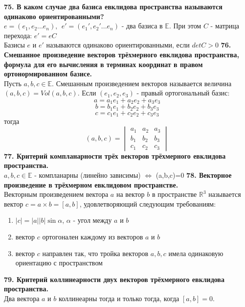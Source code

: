 \documentclass{article}
\begin{document}
\newline
\newline
\textbf{75. В каком случае два базиса евклидова пространства называются одинаково ориентированными?}\\
$e=(e_1,e_2...e_n),~~e'=(e_1',e_2'...e_n)$ - два базиса в $\mathbb{E}$. При этом $C$ - матрица перехода: $e'=eC$\\
Базисы $e$ и $e'$ называются одинаково ориентированными, если $detC>0$
\newline
\newline
\textbf{76. Смешанное произведение векторов трёхмерного евклидова пространства, формула для его вычисления в терминах координат в правом ортонормированном базисе.}\\
Пусть $a,b,c \in \mathbb{E}$. Смешанным произведением векторов называется величина $(a,b,c)=Vol(a,b,c)$. Если $(e_1,e_2,e_3)$ - правый ортогональный базис:
$$a = a_1e_1+a_2e_2+a_3e_3$$
$$b = b_1e_1+b_2e_2+b_3e_3$$
$$c = c_1e_1+c_2e_2+c_3e_3$$
тогда $$(a,b,c)=
\begin{vmatrix}
a_1 & a_2 & a_3\\
b_1 & b_2 & b_3\\
c_1 & c_2 & c_3
\end{vmatrix}$$
\newline
\newline
\textbf{77. Критерий компланарности трёх векторов трёхмерного евклидова пространства.}\\
$a,b,c \in \mathbb{E}$ - компланарны (линейно зависимы) $\Leftrightarrow$ (a,b,c)=0
\newline
\newline
\textbf{78. Векторное произведение в трёхмерном евклидовом пространстве.}\\
   Векторным произведением вектора $a$ на вектор $b$ в пространстве $\mathbb{R}^3$ называется вектор $c = a \times b = [a, b]$, удовлетворяющий следующим требованиям:
   \begin{enumerate}
       \item $|c| = |a||b|\sin \alpha$, $\alpha$ - угол между $a$ и $b$
       \item вектор $c$ ортогонален каждому из векторов $a$ и $b$
       \item вектор $c$ направлен так, что тройка векторов $a, b, c$ имела одинаковую ориентацию с пространством
   \end{enumerate}
\noindent
\textbf{79. Критерий коллинеарности двух векторов трёхмерного евклидова пространства.}\\
   Два вектора $a$ и $b$ коллинеарны тогда и только тогда, когда $[a, b] = 0$.
\end{document}
